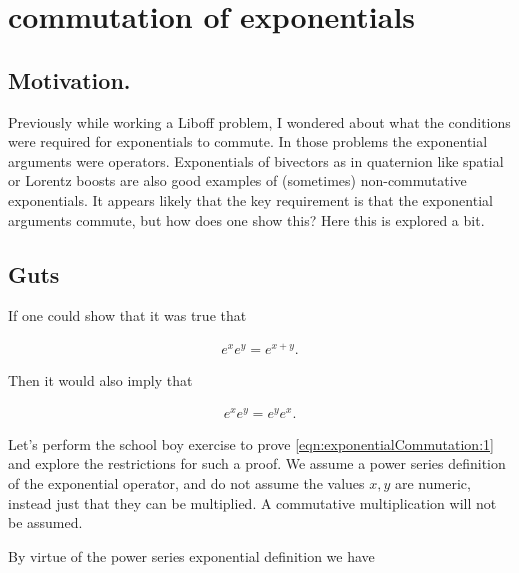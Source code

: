
%

\chapter{commutation of exponentials}
\label{chap:exponentialCommutation}
{}
\date{May 30, 2010}

\beginArtNoToc

\section{Motivation.}

Previously while working a Liboff problem, I wondered about what the conditions were required for exponentials to commute.  In those problems the exponential arguments were operators.  Exponentials of bivectors as in quaternion like spatial or Lorentz boosts are also good examples of (sometimes) non-commutative exponentials.  It appears likely that the key requirement is that the exponential arguments commute, but how does one show this?  Here this is explored a bit.

\section{Guts}

If one could show that it was true that

\begin{align}\label{eqn:exponentialCommutation:1}
e^{x} e^{y} = e^{x + y}.
\end{align}

Then it would also imply that 

\begin{align}\label{eqn:exponentialCommutation:2}
e^{x} e^{y} = e^{y} e^{x}.
\end{align}

Let's perform the school boy exercise to prove \ref{eqn:exponentialCommutation:1} and explore the restrictions for such a proof.  We assume a power series definition of the exponential operator, and do not assume the values $x,y$ are numeric, instead just that they can be multiplied.  A commutative multiplication will not be assumed.

By virtue of the power series exponential definition we have

